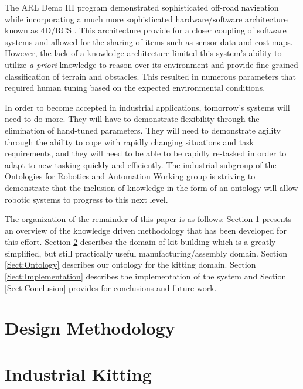 \documentclass[preprint,12pt]{elsarticle}
\begin{document}
The ARL Demo III program demonstrated sophisticated off-road navigation while incorporating a much more sophisticated
hardware/software architecture known as 4D/RCS \cite{Albus2000}. This
architecture provide for a closer coupling of software systems and allowed for the sharing of items such as sensor data and cost maps.
However, the lack of a knowledge architecture limited this system\rq{}s ability to utilize \textit{a priori} knowledge to reason over its environment
and provide fine-grained classification of terrain and obstacles. This resulted in numerous parameters that required human tuning based on
the expected environmental conditions.

In order to become accepted in industrial applications, tomorrow\rq{}s systems will need to do more. They will have to demonstrate flexibility through the
elimination of hand-tuned parameters. They will need to demonstrate agility through the ability to cope with rapidly changing situations and task requirements,
and they will need to be able to be rapidly re-tasked in order to adapt to new tasking quickly and efficiently. The  industrial subgroup of the
Ontologies for Robotics and Automation Working group is striving to demonstrate that the inclusion of knowledge in the form of an ontology
will allow robotic systems to progress to this next level.

The organization of the remainder of this paper is as follows: Section \ref{Sect:Methodology} presents an overview of the knowledge driven methodology that
has been developed for this effort. Section \ref{Sect:Kitting} describes the domain of kit building
which is a greatly simplified, but still practically useful manufacturing/assembly domain. Section \ref{Sect:Ontology} describes our ontology for the kitting
domain. Section \ref{Sect:Implementation} describes the implementation of the system and Section \ref{Sect:Conclusion} provides for conclusions and
future work.


\section{Design Methodology}
\label{Sect:Methodology}


\section{Industrial Kitting}
\label{Sect:Kitting}


\end{document}
